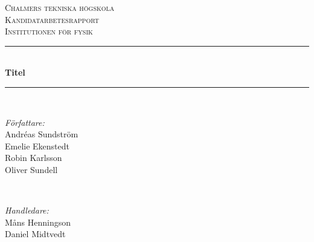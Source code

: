 
\newcommand{\andsunds}{andsunds@student.chalmers.se}
\newcommand{\emeeke}{emeeke@student.chalmers.se}
\newcommand{\robka}{robka@student.chalmers.se}
\newcommand{\soliver}{soliver@student.chalmers.se}


\renewcommand{\thefootnote}{\fnsymbol{footnote}}

\begin{titlepage}

\newcommand{\HRule}{\rule{\linewidth}{0.5mm}} %

\center %
 

\textsc{\huge Chalmers tekniska högskola}\\[1.5cm] %
\textsc{\Large Kandidatarbetesrapport}\\[0.2cm] %
\textsc{\large Institutionen för fysik }\\[0.5cm] %


\HRule \\[0.4cm]
{ \huge \bfseries 
Titel 
}\\[0.4cm] %
\HRule \\[1.5cm]
 

\begin{minipage}{0.4\textwidth}
\begin{flushleft} \large
\emph{Författare:}\\
Andréas Sundström\footnotemark{} \\
Emelie Ekenstedt\footnotemark{} \\
Robin Karlsson\footnotemark{} \\
Oliver Sundell\footnotemark{}
\end{flushleft}
\end{minipage}
~
\begin{minipage}{0.4\textwidth}
\begin{flushright} \large
\emph{Handledare:} \\
Måns Henningson\\
Daniel Midtvedt
\end{flushright}
\end{minipage}\\[3cm]


\end{titlepage}
